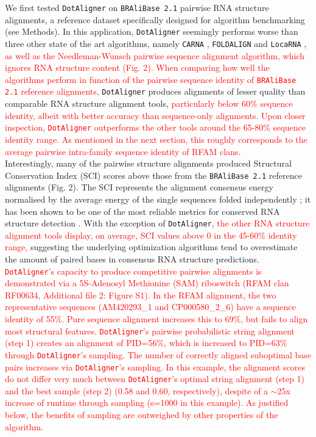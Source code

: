 \documentclass{bmcart}
\newcommand\dotaligner{\texttt{DotAligner}}
\newcommand\bralibase{\texttt{BRAliBase 2.1}}
\newcommand\locarna{\texttt{LocaRNA}}
\newcommand\foldalign{\texttt{FOLDALIGN}}
\newcommand\carna{\texttt{CARNA}}
\begin{document}
We first tested \dotaligner{} on \bralibase{} pairwise RNA structure alignments, a reference 
dataset specifically designed for algorithm benchmarking 
\cite{Gardner15860779,wilm2006enhanced} (see Methods). In this application, \dotaligner{} seemingly  
performs worse than three other state of the art algorithms, namely \carna{} \cite{Sorescu2012}, \foldalign{} \cite{havgaard2007fast,sundfeld2015foldalign} and \locarna{} \cite{Will17432929}, \textcolor{red}{ as well as the Needleman-Wunsch pairwise sequence alignment algorithm, which ignores RNA structure content (Fig. 2).
When comparing how well the algorithms perform in function of the pairwise 
sequence identity of \bralibase{} reference alignments, }
\dotaligner{} produces alignments of lesser quality than comparable 
RNA structure alignment tools, \textcolor{red}{particularly below 60\% sequence identity, 
albeit with better accuracy than sequence-only alignments. 
Upon closer inspection, \dotaligner{} outperforms the other tools around the 65-80\%
sequence identity range. As mentioned in the next section, this roughly corresponds to the 
average pairwise intra-family sequence identity of RFAM clans.}\\

Interestingly, many of the pairwise structure alignments produced Structural 
Conservation Index (SCI) scores above those from the \bralibase{} reference alignments 
(Fig. 2). The SCI represents the alignment consensus energy normalised
 by the average energy of the single sequences folded independently \cite{washietl2005fast}; 
it has been shown to be one of the most reliable metrics for conserved RNA structure 
detection \cite{gruber2008strategies}. With the exception of \dotaligner{}, 
\textcolor{red}{
the other  RNA structure alignment tools display, on average, SCI values above 0 in the 45-60\% identity range, } 
suggesting the underlying optimization algorithms tend to overestimate the amount of paired bases in consensus RNA structure predictions.\\

\textcolor{red}{
\dotaligner's capacity to produce competitive pairwise alignments is demonstrated 
via a 5S-Adenosyl Methionine (SAM) riboswitch (RFAM clan RF00634, Additional file 2: Figure S1). 
In the RFAM alignment, the two representative sequences (AM420293\_1 and CP000580\_2\_6) 
have a sequence identity of 55\%. Pure sequence alignment increases this to 69\%, 
but fails to align most structural features. 
\dotaligner's pairwise probabilistic string alignment (step 1) creates an alignment of PID=56\%, which is increased to PID=63\% through \dotaligner's sampling.
The number of correctly aligned suboptimal base pairs increases via \dotaligner{}'s sampling. In this example, the alignment scores do not differ very much between \dotaligner{}'s optimal string alignment (step 1) and the best sample (step 2) (0.58 and 0.60, respectively), despite of a $\sim$25x increase of runtime through sampling (s=1000 in this example). As justified below, the benefits of sampling are outweighed by other properties of the algorithm. \\ 
}
\end{document}
